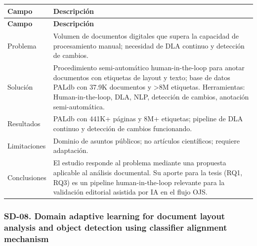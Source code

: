 \begin{longtable}{@{}>{\raggedright\arraybackslash}p{}>{\raggedright\arraybackslash}p{}@{}}
\toprule
\textbf{Campo} & \textbf{Descripción} \\
\midrule
\endfirsthead
\toprule
\textbf{Campo} & \textbf{Descripción} \\
\midrule
\endhead
\bottomrule
\endfoot
\endlastfoot
Problema & Volumen de documentos digitales que supera la capacidad de procesamiento manual; necesidad de DLA continuo y detección de cambios. \\
Solución & Procedimiento semi-automático human-in-the-loop para anotar documentos con etiquetas de layout y texto; base de datos PALdb con 37.9K documentos y >8M etiquetas. Herramientas: Human-in-the-loop, DLA, NLP, detección de cambios, anotación semi-automática. \\
Resultados & PALdb con 441K+ páginas y 8M+ etiquetas; pipeline de DLA continuo y detección de cambios funcionando. \\
Limitaciones & Dominio de asuntos públicos; no artículos científicos; requiere adaptación. \\
Conclusiones & El estudio responde al problema mediante una propuesta aplicable al análisis documental. Su aporte para la tesis (RQ1, RQ3) es un pipeline human-in-the-loop relevante para la validación editorial asistida por IA en el flujo OJS. \\
\end{longtable}

\subsubsection*{SD-08. Domain adaptive learning for document layout analysis and object detection using classifier alignment mechanism}

